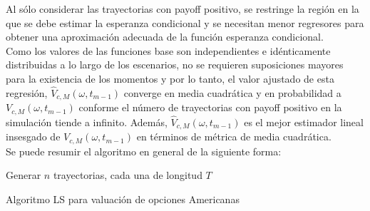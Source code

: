 \documentclass[11pt]{article}
\begin{document}
Al sólo considerar las trayectorias con payoff positivo, se restringe la región en la que se debe estimar la esperanza condicional y se necesitan
menor regresores para obtener una aproximación adecuada de la función esperanza condicional.\\

Como los valores de las funciones base son independientes e idénticamente distribuidas a lo largo de los escenarios, no se requieren suposiciones mayores para la existencia de los momentos y por lo tanto, el valor ajustado de esta regresión,
$\widehat{V}_{c,M}(\omega,t_{m-1})$ converge en media cuadrática y en probabilidad a $V_{c,M}(\omega,t_{m-1})$ conforme el número de
trayectorias con payoff positivo en la simulación tiende a infinito. Además, $\widehat{V}_{c,M}(\omega,t_{m-1})$ es el mejor estimador lineal insesgado de $V_{c,M}(\omega,t_{m-1})$ en términos de métrica
de media cuadrática.\\

Se puede resumir el algoritmo en general de la siguiente forma:\\

\begin{algorithm}[H]
\DontPrintSemicolon
\SetAlgoLined
{}
\BlankLine
Generar $n$ trayectorias, cada una de longitud $T$\\
\caption{Algoritmo LS para valuación de opciones Americanas}
\end{algorithm}

\ \\
\end{document}

